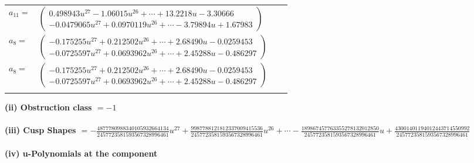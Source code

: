 \documentclass[1p]{elsarticle_modified}
\theoremstyle{definition}
\begin{document}
\begin{tabular}{m{7pt} m{180pt} m{7pt} m{180pt} }
\flushright $a_{11}=$&$\begin{pmatrix}0.498943 u^{27}-1.06015 u^{26}+\cdots+13.2218 u-3.30666\\-0.0479065 u^{27}+0.0970119 u^{26}+\cdots-3.79894 u+1.67983\end{pmatrix}$ \\
\flushright $a_{8}=$&$\begin{pmatrix}-0.175255 u^{27}+0.212502 u^{26}+\cdots+2.68490 u-0.0259453\\-0.0725597 u^{27}+0.0693962 u^{26}+\cdots+2.45288 u-0.486297\end{pmatrix}$\\ \flushright $a_{8}=$&$\begin{pmatrix}-0.175255 u^{27}+0.212502 u^{26}+\cdots+2.68490 u-0.0259453\\-0.0725597 u^{27}+0.0693962 u^{26}+\cdots+2.45288 u-0.486297\end{pmatrix}$\\&\end{tabular}
\flushleft \textbf{(ii) Obstruction class $= -1$}\\~\\
\flushleft \textbf{(iii) Cusp Shapes $= -\frac{4877780988340105932664134}{2457723581593567328996461} u^{27}+\frac{9987788121812337009415536}{2457723581593567328996461} u^{26}+\cdots-\frac{189867457763355278132012850}{2457723581593567328996461} u+\frac{43001401194012443714550992}{2457723581593567328996461}$}\\~\\
\newpage\renewcommand{\arraystretch}{1}
\flushleft \textbf{(iv) u-Polynomials at the component}\newline \\
\end{document}
